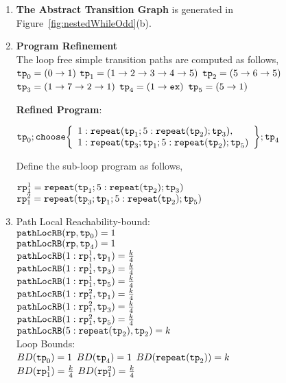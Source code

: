   \begin{enumerate}
    \item  \textbf{The Abstract Transition Graph} is generated in Figure~\ref{fig:nestedWhileOdd}(b).
    \item \textbf{Program Refinement}
    \\
    The loop free simple transition paths are computed as follows,
      \\ 
    $\mathtt{tp}_0 = (0 \to 1)$
      \quad
      $\mathtt{tp}_1 = (1 \to 2 \to 3 \to 4 \to 5)$
      \quad
      $\mathtt{tp}_2 = (5 \to 6 \to 5)$
      \quad
      $\mathtt{tp}_3 = (1 \to 7 \to 2 \to 1)$
      \quad
      $\mathtt{tp}_4 = (1 \to \mathtt{ex})$
      \quad
      $\mathtt{tp}_5 = (5 \to 1)$

  \textbf{Refined Program}:


    $ \tpath_0 ; \rpchoose{
      \begin{array}{l}
        1: \rprepeat(\tpath_1; 5:\rprepeat(\tpath_2); \tpath_3) ,  \\
        1: \rprepeat(\tpath_3; \tpath_1; 5:\rprepeat(\tpath_2); \tpath_5 )
      \end{array}
      }; \tpath_4$

      Define the sub-loop program as follows,

      $\mathtt{rp}_1^1 = \mathtt{repeat}(\mathtt{tp}_1; 5:\mathtt{repeat}(\mathtt{tp}_2); \mathtt{tp}_3)$
    \\
    $\mathtt{rp}_1^2 = \mathtt{repeat}(\mathtt{tp}_3; \mathtt{tp}_1; 5:\mathtt{repeat}(\mathtt{tp}_2) ; \mathtt{tp}_5 )$
    \item {Path Local Reachability-bound}:
    \\
    $\mathtt{pathLocRB}(\mathtt{rp}, \mathtt{tp}_0) = 1$ \\
    $\mathtt{pathLocRB}(\mathtt{rp}, \mathtt{tp}_4) = 1$ \\
    $\mathtt{pathLocRB}(1: \mathtt{rp}_1^1, \mathtt{tp}_1) = \frac{k}{4}$ \\
    $\mathtt{pathLocRB}(1: \mathtt{rp}_1^1, \mathtt{tp}_3) = \frac{k}{4}$ \\
    $\mathtt{pathLocRB}(1: \mathtt{rp}_1^1, \mathtt{tp}_5) = \frac{k}{4}$ \\
    $\mathtt{pathLocRB}(1: \mathtt{rp}_1^2, \mathtt{tp}_1) = \frac{k}{4}$ \\
    $\mathtt{pathLocRB}(1: \mathtt{rp}_1^2, \mathtt{tp}_3) = \frac{k}{4}$ \\
    $\mathtt{pathLocRB}(1: \mathtt{rp}_1^2, \mathtt{tp}_5) = \frac{k}{4}$ \\
    $\mathtt{pathLocRB}(5: \mathtt{repeat}(\mathtt{tp}_2), \mathtt{tp}_2) = k$ 
    \\
    Loop Bounds:
    \\
    $BD(\mathtt{tp}_0) = 1$
    \quad
    $BD(\mathtt{tp}_4) = 1$
    \quad
    $BD(\mathtt{repeat}(\mathtt{tp}_2)) = k $
    \\
    $BD(\mathtt{rp}_1^1) = \frac{k}{4} $
    \quad
    $BD(\mathtt{rp}_1^2) = \frac{k}{4} $


\end{enumerate}
